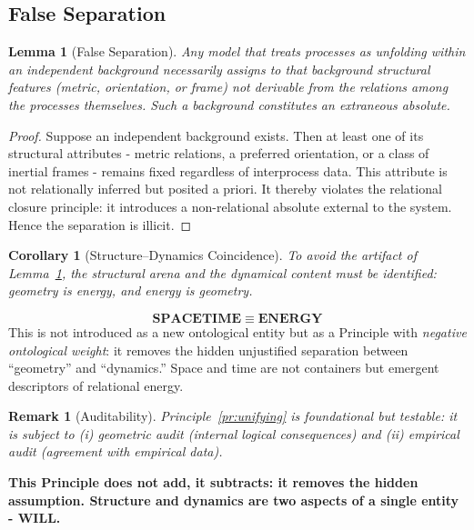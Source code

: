 \documentclass[12pt, a4paper]{article}
\newtheorem{lemma}[theorem]{Lemma}
\newtheorem{corollary}[theorem]{Corollary}
\newtheorem{remark}[theorem]{Remark}
\begin{document}
\subsection{False Separation}
\begin{lemma}[False Separation]
\label{lem:false-separation}
Any model that treats processes as unfolding \emph{within} an independent background necessarily assigns to that background structural features (metric, orientation, or frame) not derivable from the relations among the processes themselves. Such a background constitutes an \emph{extraneous absolute}.
\end{lemma}

\begin{proof}
Suppose an independent background exists. Then at least one of its structural attributes - metric relations, a preferred orientation, or a class of inertial frames - remains fixed regardless of interprocess data. This attribute is not relationally inferred but posited a priori. It thereby violates the relational closure principle: it introduces a non-relational absolute external to the system. Hence the separation is illicit.  
\end{proof}

\begin{corollary}[Structure--Dynamics Coincidence]
\label{cor:coincidence}
To avoid the artifact of Lemma~\ref{lem:false-separation}, the structural arena and the dynamical content must be identified: geometry \emph{is} energy, and energy \emph{is} geometry.
\end{corollary}
\begin{Principle}
\label{pr:unifying}
\[
\boxed{\textbf{SPACETIME} \;\equiv\; \textbf{ENERGY}}
\]
This is not introduced as a new ontological entity but as a Principle with 
\emph{negative ontological weight}: it removes the hidden unjustified separation 
between “geometry” and “dynamics.” Space and time are not containers but 
emergent descriptors of relational energy.
\end{Principle}

\begin{remark}[Auditability]
Principle~\ref{pr:unifying} is foundational but testable: it is subject to (i) geometric audit (internal logical consequences) and (ii) empirical audit (agreement with empirical data).
\end{remark}

\begin{tcolorbox}[colback=gray!5, colframe=black!80!black, title=Summary:]
\textbf{This Principle does not add, it subtracts: it removes the hidden assumption.  Structure and dynamics are two aspects of a single entity - WILL.}
\end{tcolorbox}
\end{document}
